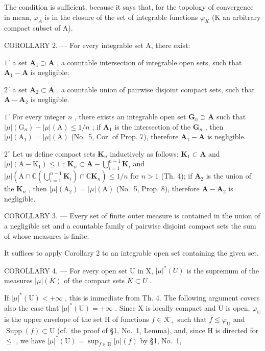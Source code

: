 The condition is sufficient, because it says that, for the topology of convergence in mean, \(\varphi_{A}\) is in the closure of the set of integrable functions \(\varphi_{K}\) (K an arbitrary compact subset of A).

COROLLARY 2. --- For every integrable set A, there exist:

\(1^{\circ}\) a set \(\mathbf{A}_1\supset \mathbf{A}\) , a countable intersection of integrable open sets, such that \(\mathbf{A}_1 - \mathbf{A}\) is negligible;

\(2^{\circ}\) a set \(\mathbf{A}_2\subset \mathbf{A}\) , a countable union of pairwise disjoint compact sets, such that \(\mathbf{A} - \mathbf{A}_2\) is negligible.

\(1^{\circ}\) For every integer \(n\) , there exists an integrable open set \(\mathbf{G}_n \supset \mathbf{A}\) such that \(|\mu| (\mathrm{G}_n) - |\mu| (\mathrm{A}) \leqslant 1/n\) ; if \(\mathbf{A}_1\) is the intersection of the \(\mathbf{G}_n\) , then \(|\mu| (\mathrm{A}_1) = |\mu| (\mathrm{A})\) (No.~5, Cor. of Prop. 7), therefore \(\mathbf{A}_1 - \mathbf{A}\) is negligible.

\(2^{\circ}\) Let us define compact sets \(\mathbf{K}_n\) inductively as follows: \(\mathbf{K}_1 \subset \mathbf{A}\) and \(|\mu| (\mathrm{A} - \mathrm{K}_1) \leqslant 1\) ; \(\mathbf{K}_n \subset \mathbf{A} - \bigcup_{i=1}^{n-1} \mathbf{K}_i\) and \(|\mu| (\mathrm{A} \cap \mathbb{C}(\bigcup_{i=1}^{n-1} \mathbf{K}_i) \cap \mathbb{C} \mathbf{K}_n) \leqslant 1/n\) for \(n > 1\) (Th. 4); if \(\mathbf{A}_2\) is the union of the \(\mathbf{K}_n\) , then \(|\mu| (\mathrm{A}_2) = |\mu| (\mathrm{A})\) (No.~5, Prop. 8), therefore \(\mathbf{A} - \mathbf{A}_2\) is negligible.

COROLLARY 3. --- Every set of finite outer measure is contained in the union of a negligible set and a countable family of pairwise disjoint compact sets the sum of whose measures is finite.

It suffices to apply Corollary 2 to an integrable open set containing the given set.

COROLLARY 4. --- For every open set U in X, \(|\mu|^{*}(U)\) is the supremum of the measures \(|\mu|(K)\) of the compact sets \(K \subset U\) .

If \(|\mu|^*(\mathrm{U}) < +\infty\) , this is immediate from Th. 4. The following argument covers also the case that \(|\mu|^*(\mathrm{U}) = +\infty\) . Since X is locally compact and U is open, \(\varphi_{\mathrm{U}}\) is the upper envelope of the set H of functions \(f \in \mathcal{K}_{+}\) such that \(f \leqslant \varphi_{\mathrm{U}}\) and \(\operatorname{Supp}(f) \subset \mathrm{U}\) (cf.~the proof of §1, No.~1, Lemma), and, since H is directed for \(\leqslant\) , we have \(|\mu|^*(\mathrm{U}) = \sup_{f \in \mathrm{H}} |\mu|(f)\) by §1, No.~1,

